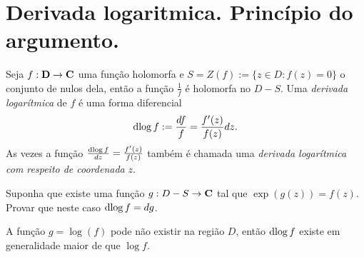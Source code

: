 \section{Derivada logaritmica. Princípio do argumento.}

\begin{defin}
Seja $f : \mathbf{D} \to \mathbf{C}$ uma função holomorfa
e $S = Z(f) := \{ z\in D: f(z) = 0 \}$ o conjunto de nulos dela,
então a função $\frac{1}{f}$ é holomorfa no $D-S$.
Uma \emph{derivada logarítmica} de $f$ é uma forma diferencial
\begin{equation}
\operatorname{dlog} f := \frac{df}{f} = \frac{f'(z)}{f(z)} dz.
\end{equation}
As vezes a função $\frac{\operatorname{dlog} f}{dz} = \frac{f'(z)}{f(z)}$ também é chamada uma \emph{derivada logarítmica}
\emph{com respeito de coordenada} $z$.
\end{defin}

\begin{problema}
Suponha que existe uma função $g: D-S\to\mathbf{C}$ tal que $\exp(g(z)) = f(z)$.
Provar que neste caso $\operatorname{dlog} f = dg$.
\end{problema}

A função $g=\log(f)$ pode não existir na região $D$, então $\operatorname{dlog} f$ existe em generalidade
maior de que $\log f$.

